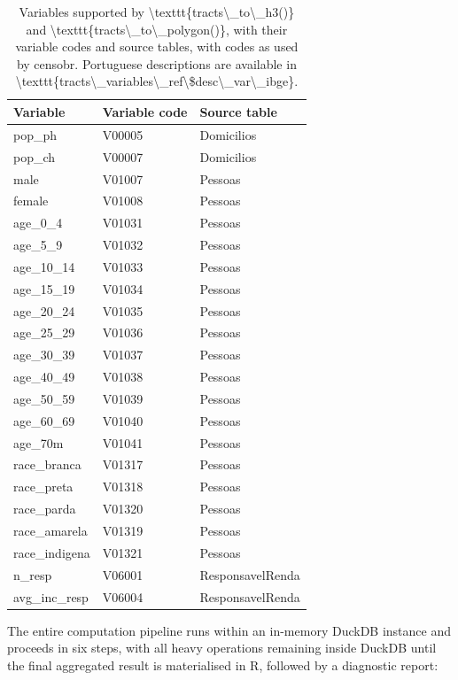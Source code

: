 \begin{table}

\caption{\label{tab:tab-tracts-vars}Variables supported by \textbackslash{}texttt\{tracts\textbackslash{}\_to\textbackslash{}\_h3()\} and \textbackslash{}texttt\{tracts\textbackslash{}\_to\textbackslash{}\_polygon()\}, with their variable codes and source tables, with codes as used by censobr. Portuguese descriptions are available in \textbackslash{}texttt\{tracts\textbackslash{}\_variables\textbackslash{}\_ref\textbackslash{}\$desc\textbackslash{}\_var\textbackslash{}\_ibge\}.}
\centering
\begin{tabular}[t]{lll}
\toprule
Variable & Variable code & Source table\\
\midrule
pop\_ph & V00005 & Domicilios\\
pop\_ch & V00007 & Domicilios\\
male & V01007 & Pessoas\\
female & V01008 & Pessoas\\
age\_0\_4 & V01031 & Pessoas\\
\addlinespace
age\_5\_9 & V01032 & Pessoas\\
age\_10\_14 & V01033 & Pessoas\\
age\_15\_19 & V01034 & Pessoas\\
age\_20\_24 & V01035 & Pessoas\\
age\_25\_29 & V01036 & Pessoas\\
\addlinespace
age\_30\_39 & V01037 & Pessoas\\
age\_40\_49 & V01038 & Pessoas\\
age\_50\_59 & V01039 & Pessoas\\
age\_60\_69 & V01040 & Pessoas\\
age\_70m & V01041 & Pessoas\\
\addlinespace
race\_branca & V01317 & Pessoas\\
race\_preta & V01318 & Pessoas\\
race\_parda & V01320 & Pessoas\\
race\_amarela & V01319 & Pessoas\\
race\_indigena & V01321 & Pessoas\\
\addlinespace
n\_resp & V06001 & ResponsavelRenda\\
avg\_inc\_resp & V06004 & ResponsavelRenda\\
\bottomrule
\end{tabular}
\end{table}

The entire computation pipeline runs within an in-memory DuckDB instance
and proceeds in six steps, with all heavy operations remaining inside
DuckDB until the final aggregated result is materialised in R, followed
by a diagnostic report:

